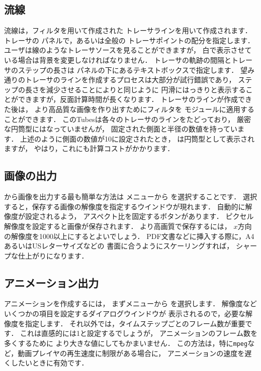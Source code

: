 \subsection{流線}
\label{ssec:6.1.8}
流線は，フィルタを用いて作成された
トレーサラインを用いて作成されます．
トレーサの
%
%
パネルで，あるいは全般の
トレーサポイントの配分を指定します．
ユーザは線のようなトレーサソースを見ることができますが，
白で表示させている場合は背景を変更しなければなりません．
トレーサの軌跡の間隔とトレーサのステップの長さは
パネルの下にあるテキストボックスで指定します．
望み通りのトレーサのラインを作成するプロセスは大部分が試行錯誤であり，
ステップの長さを減少させることによりと同じように
円滑にはっきりと表示することができますが，反面計算時間が長くなります．
トレーサのラインが作成できた後は，
より高品質な画像を作り出すためにフィルタを
モジュールに適用することができます．
このTubesは各々のトレーサのラインをたどっており，
厳密な円筒型にはなっていませんが，
固定された側面と半径の数値を持っています．
上述のように側面の数値が10に設定されたとき，
は円筒型として表示されますが，
やはり，これにも計算コストがかかります．


\subsection{画像の出力}
\label{ssec:6.1.9}
から画像を出力する最も簡単な方法は
メニューから
%
%
を選択することです．
選択すると，保存する画像の解像度を指定するウインドウが現れます．
自動的に解像度が設定されるよう，
アスペクト比を固定するボタンがあります．
ピクセル解像度を設定すると画像が保存されます．
より高画質で保存するには，
$x$方向の解像度を1000以上にするとよいでしょう．
PDF文書などに挿入する際に，A4あるいはUSレターサイズなどの
書面に合うようにスケーリングすれば，
シャープな仕上がりになります．


\subsection{アニメーション出力}
\label{ssec:6.1.10}
アニメーションを作成するには，
まずメニューから
%
%
を選択します．
解像度などいくつかの項目を設定するダイアログウインドウが
表示されるので，必要な解像度を指定します．
それ以外では，タイムステップごとのフレーム数が重要です．
これは直感的には1と設定するでしょうが，
アニメーションのフレーム数を多くするために
より大きな値にしてもかまいません．
この方法は，特に\texttt{mpeg}など，動画プレイヤの再生速度に制限がある場合に，
アニメーションの速度を遅くしたいときに有効です．

